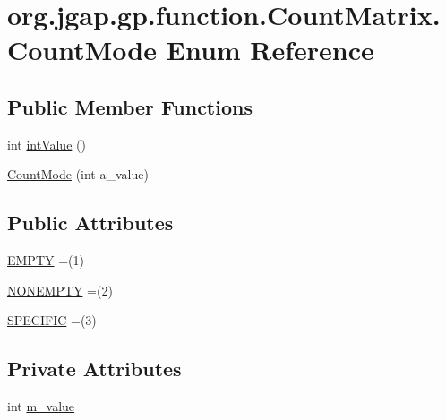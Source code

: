 \hypertarget{enumorg_1_1jgap_1_1gp_1_1function_1_1_count_matrix_1_1_count_mode}{\section{org.\-jgap.\-gp.\-function.\-Count\-Matrix.\-Count\-Mode Enum Reference}
\label{enumorg_1_1jgap_1_1gp_1_1function_1_1_count_matrix_1_1_count_mode}
}
\subsection*{Public Member Functions}
\begin{DoxyCompactItemize}
\item 
int \hyperlink{enumorg_1_1jgap_1_1gp_1_1function_1_1_count_matrix_1_1_count_mode_a5155f712b175bae0355197281690ed73}{int\-Value} ()
\item 
\hyperlink{enumorg_1_1jgap_1_1gp_1_1function_1_1_count_matrix_1_1_count_mode_a274c01d42f074dc5b211201070e32331}{Count\-Mode} (int a\-\_\-value)
\end{DoxyCompactItemize}
\subsection*{Public Attributes}
\begin{DoxyCompactItemize}
\item 
\hyperlink{enumorg_1_1jgap_1_1gp_1_1function_1_1_count_matrix_1_1_count_mode_a92f9a66ce5d36d5d7011fc6678714b7a}{E\-M\-P\-T\-Y} =(1)
\item 
\hyperlink{enumorg_1_1jgap_1_1gp_1_1function_1_1_count_matrix_1_1_count_mode_a62fbc7b1b3e5481759b6841ab3ec0369}{N\-O\-N\-E\-M\-P\-T\-Y} =(2)
\item 
\hyperlink{enumorg_1_1jgap_1_1gp_1_1function_1_1_count_matrix_1_1_count_mode_a0ba7a45ff144a42e337ecabdcb783a01}{S\-P\-E\-C\-I\-F\-I\-C} =(3)
\end{DoxyCompactItemize}
\subsection*{Private Attributes}
\begin{DoxyCompactItemize}
\item 
int \hyperlink{enumorg_1_1jgap_1_1gp_1_1function_1_1_count_matrix_1_1_count_mode_ab24868b4fd32e75d5a6f0d2c4964ca03}{m\-\_\-value}
\end{DoxyCompactItemize}


